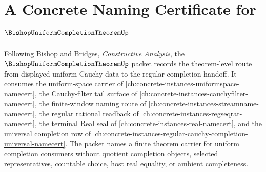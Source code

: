 \chapter{A Concrete Naming Certificate for $\BishopUniformCompletionTheoremUp$}
\label{ch:concrete-instances-bishop-uniform-completion-theorem-namecert}

Following Bishop and Bridges, \emph{Constructive Analysis}, the $\BishopUniformCompletionTheoremUp$ packet records the theorem-level route from displayed uniform Cauchy data to the regular completion handoff. It consumes the uniform-space carrier of \autoref{ch:concrete-instances-uniformspace-namecert}, the Cauchy-filter tail surface of \autoref{ch:concrete-instances-cauchyfilter-namecert}, the finite-window naming route of \autoref{ch:concrete-instances-streamname-namecert}, the regular rational readback of \autoref{ch:concrete-instances-regseqrat-namecert}, the terminal Real seal of \autoref{ch:concrete-instances-real-namecert}, and the universal completion row of \autoref{ch:concrete-instances-regular-cauchy-completion-universal-namecert}. The packet names a finite theorem carrier for uniform completion consumers without quotient completion objects, selected representatives, countable choice, host real equality, or ambient completeness.

